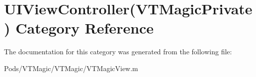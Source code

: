 \hypertarget{category_u_i_view_controller_07_v_t_magic_private_08}{}\section{U\+I\+View\+Controller(V\+T\+Magic\+Private) Category Reference}
\label{category_u_i_view_controller_07_v_t_magic_private_08}


The documentation for this category was generated from the following file\+:\begin{DoxyCompactItemize}
\item 
Pods/\+V\+T\+Magic/\+V\+T\+Magic/V\+T\+Magic\+View.\+m\end{DoxyCompactItemize}

